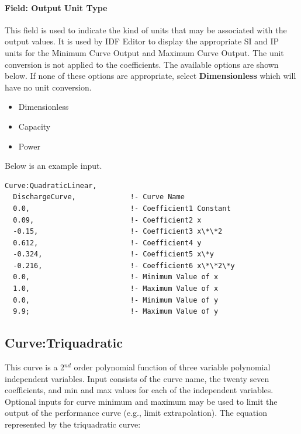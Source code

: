\paragraph{Field: Output Unit Type}\label{field-output-unit-type-9}

This field is used to indicate the kind of units that may be associated with the output values. It is used by IDF Editor to display the appropriate SI and IP units for the Minimum Curve Output and Maximum Curve Output. The unit conversion is not applied to the coefficients. The available options are shown below. If none of these options are appropriate, select \textbf{Dimensionless} which will have no unit conversion.

\begin{itemize}
\item
  Dimensionless
\item
  Capacity
\item
  Power
\end{itemize}

Below is an example input.

\begin{lstlisting}
Curve:QuadraticLinear,
  DischargeCurve,             !- Curve Name
  0.0,                        !- Coefficient1 Constant
  0.09,                       !- Coefficient2 x
  -0.15,                      !- Coefficient3 x\*\*2
  0.612,                      !- Coefficient4 y
  -0.324,                     !- Coefficient5 x\*y
  -0.216,                     !- Coefficient6 x\*\*2\*y
  0.0,                        !- Minimum Value of x
  1.0,                        !- Maximum Value of x
  0.0,                        !- Minimum Value of y
  9.9;                        !- Maximum Value of y
\end{lstlisting}

\subsection{Curve:Triquadratic}\label{curvetriquadratic}

This curve is a 2\(^{nd}\) order polynomial function of three variable polynomial independent variables. Input consists of the curve name, the twenty seven coefficients, and min and max values for each of the independent variables. Optional inputs for curve minimum and maximum may be used to limit the output of the performance curve (e.g., limit extrapolation). The equation represented by the triquadratic curve:

